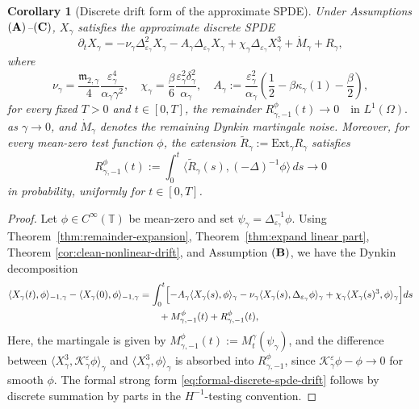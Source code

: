 \documentclass{article}
\newtheorem{corollary}[theorem]{Corollary}
\begin{document}
\begin{corollary}[Discrete drift form of the approximate SPDE]\label{cor:discrete-spde-drift-form}
Under Assumptions \(({\bf A})\)--\(({\bf C})\), $X_{\gamma}$ satisfies the approximate discrete SPDE 
\begin{equation}
\partial_t X_\gamma = -\nu_\gamma\Delta_{\varepsilon_\gamma}^2X_\gamma
-A_\gamma\Delta_{\varepsilon_\gamma}X_\gamma
+\chi_\gamma\Delta_{\varepsilon_\gamma} X_\gamma^3
+\dot M_\gamma+R_\gamma,
\label{eq:formal-discrete-spde-drift}
\end{equation}
where
\[
\nu_\gamma=
\frac{\mathfrak m_{2,\gamma}}{4}
\frac{\varepsilon_\gamma^4}{\alpha_\gamma\gamma^2},
\quad
\chi_\gamma=
\frac{\beta}{6}
\frac{\varepsilon_\gamma^2\delta_\gamma^2}{\alpha_\gamma}, \quad A_\gamma := \frac{\varepsilon_\gamma^2}{\alpha_\gamma} \left( \frac12-\beta\kappa_\gamma(1) - \frac{\beta}{2} \right),
\]
for every fixed \(T>0\) and \(t\in[0,T]\), the remainder
\(
R_{\gamma,-1}^{\phi}(t)\rightarrow0 \quad\text{in }L^1(\Omega).
\) as $\gamma \to 0$, and \(\dot M_\gamma\) denotes the remaining Dynkin martingale noise.
Moreover, for every mean-zero test function \(\phi\), the extension \(\widetilde R_\gamma:=\mathrm{Ext}_\gamma R_\gamma\) satisfies
\[
R_{\gamma,-1}^{\phi}(t)
:=
\int_0^t
\bigl\langle
\widetilde R_\gamma(s),(-\Delta)^{-1}\phi
\bigr\rangle\,ds \to 0
\]
in probability, uniformly for \(t\in[0,T]\).  
\end{corollary}

\begin{proof}
Let \(\phi\in C^\infty(\mathbb T)\) be mean-zero and set \(\psi_\gamma=\Delta_{\varepsilon_\gamma}^{-1}\phi\). 
Using Theorem~\ref{thm:remainder-expansion}, Theorem~\ref{thm:expand linear part}, Theorem \ref{cor:clean-nonlinear-drift}, and Assumption \(({\bf B})\), we have the Dynkin decomposition
\begin{align}
\langle X_\gamma(t),\phi\rangle_{-1,\gamma} - \langle X_\gamma(0),\phi\rangle_{-1,\gamma}
&= \int_0^t
\Bigl[ -A_\gamma\langle X_\gamma(s),\phi\rangle_\gamma
-\nu_\gamma \langle X_\gamma(s),\Delta_{\varepsilon_\gamma}\phi\rangle_\gamma +\chi_\gamma \langle X_\gamma(s)^3,\phi\rangle_\gamma \Bigr]ds \nonumber\\
&\qquad  + M_{\gamma,-1}^{\phi}(t)  + R_{\gamma,-1}^{\phi}(t),
\end{align}
Here, the martingale is given by $M_{\gamma,-1}^{\phi}(t):=M_t^\gamma(\psi_\gamma)$, and the difference between \(\langle X_\gamma^3,\mathcal K_\gamma^\varepsilon\phi\rangle_\gamma\) and \(\langle X_\gamma^3,\phi\rangle_\gamma\) is absorbed into \(R_{\gamma,-1}^{\phi}\), since \(\mathcal K_\gamma^\varepsilon\phi-\phi\to0\) for smooth \(\phi\).
The formal strong form \eqref{eq:formal-discrete-spde-drift} follows by discrete summation by parts in the \(H^{-1}\)-testing convention.
\end{proof}
\end{document}
